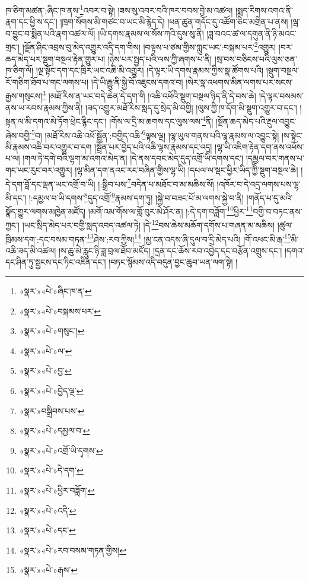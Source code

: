 ཁ་ཅིག་མཚན་:ཞིང་ཁ་ནས་\footnote{«སྣར་»«པེ་»ཞིང་ཁ་ན་}འབར་བ་སྟེ། །ཟས་སུ་འབར་བའི་ཁར་བབས་བྱེ་མ་འཚལ། །སྨད་རིགས་འགའ་ནི་རྣག་དང་ཕྱི་ས་དང་། །ཁྲག་སོགས་མི་གཙང་བ་ཡང་མི་རྙེད་དེ། །ཕན་ཚུན་གདོང་དུ་འཚོག་ཅིང་མགྲིན་པ་ནས། །ལྦ་བ་བྱུང་བ་སྨིན་པའི་རྣག་འཚལ་ལོ། །ཡི་དགས་རྣམས་ལ་སོས་ཀའི་དུས་སུ་ནི། །ཟླ་བའང་ཚ་ལ་དགུན་ནི་ཉི་མའང་གྲང་། །ལྗོན་ཤིང་འབྲས་བུ་མེད་འགྱུར་འདི་དག་གིས། །བལྟས་པ་ཙམ་གྱིས་ཀླུང་ཡང་:བསྐམ་པར་\footnote{«སྣར་»«པེ་»བསྐམས་པར་}འགྱུར། །བར་ཆད་མེད་པར་སྡུག་བསྔལ་རྟེན་གྱུར་པ། །ཉེས་པར་སྤྱད་པའི་ལས་ཀྱི་ཞགས་པ་ནི། །སྲ་བས་བཅིངས་པའི་ལུས་ཅན་ཁ་ཅིག་ལོ། །ལྔ་སྟོང་དག་དང་ཁྲིར་ཡང་འཆི་མི་འགྱུར། །དེ་ལྟར་ཡི་དགས་རྣམས་ཀྱིས་སྣ་ཚོགས་པའི། །སྡུག་བསྔལ་རོ་གཅིག་ཐོབ་པ་གང་ལགས་པ། །དེ་ཡི་རྒྱུ་ནི་སྐྱེ་བོ་འཇུངས་དགའ་བ། །སེར་སྣ་འཕགས་མིན་ལགས་པར་སངས་རྒྱས་གསུངས།\footnote{«སྣར་»«པེ་»གསུང་།} །མཐོ་རིས་ན་ཡང་བདེ་ཆེན་དེ་དག་གི །འཆི་འཕོའི་སྡུག་བསྔལ་ཉིད་ནི་དེ་བས་ཆེ། །དེ་ལྟར་བསམས་ནས་ཡ་རབས་རྣམས་ཀྱིས་ནི། །ཟད་འགྱུར་མཐོ་རིས་སླད་དུ་སྲེད་མི་བགྱི། །ལུས་ཀྱི་ཁ་དོག་མི་སྡུག་འགྱུར་བ་དང་། །སྟན་ལ་མི་དགའ་མེ་ཏོག་ཕྲེང་རྙིང་དང་། །གོས་ལ་དྲི་མ་ཆགས་དང་ལུས་ལས་\footnote{«སྣར་»«པེ་»ལ་}ནི། །སྔོན་ཆད་མེད་པའི་རྔུལ་འབྱུང་ཞེས་བགྱི་\footnote{«སྣར་»«པེ་»བྱ་}བ། །མཐོ་རིས་འཆི་འཕོ་སྦྲོན་:བགྱིད་འཆི་\footnote{«སྣར་»«པེ་»བྱེད་ལྔ་}ལྟས་ལྔ། །ལྷ་ཡུལ་གནས་པའི་ལྷ་རྣམས་ལ་འབྱུང་སྟེ། །ས་སྟེང་མི་རྣམས་འཆི་བར་འགྱུར་བ་དག །སྦྲོན་པར་བྱེད་པའི་འཆི་ལྟས་རྣམས་དང་འདྲ། །ལྷ་ཡི་འཇིག་རྟེན་དག་ནས་འཕོས་པ་ལ། །གལ་ཏེ་དགེ་བའི་ལྷག་མ་འགའ་མེད་ན། །དེ་ནས་དབང་མེད་དུད་འགྲོ་ཡི་དགས་དང་། །དམྱལ་བར་གནས་པ་གང་ཡང་རུང་བར་འགྱུར། །ལྷ་མིན་དག་ནའང་རང་བཞིན་གྱིས་ལྷ་ཡི། །དཔལ་ལ་སྡང་ཕྱིར་ཡིད་ཀྱི་སྡུག་བསྔལ་ཆེ། །དེ་དག་བློ་དང་ལྡན་ཡང་འགྲོ་བ་ཡི། །:སྒྲིབ་པས་\footnote{«སྣར་»བསྒྲིབས་པས་}བདེན་པ་མཐོང་བ་མ་མཆིས་སོ། །འཁོར་བ་དེ་འདྲ་ལགས་པས་ལྷ་མི་དང་། །:དམྱལ་བ་ཡི་དགས་\footnote{«སྣར་»«པེ་»དམྱལ་བ་}དུད་འགྲོ་\footnote{«སྣར་»«པེ་»འགྲོ་ཡི་དྭགས་}རྣམས་དག་ཏུ། །སྐྱེ་བ་བཟང་པོ་མ་ལགས་སྐྱེ་བ་ནི། །གནོད་པ་དུ་མའི་སྣོད་གྱུར་ལགས་མཁྱེན་མཛོད། །མགོ་འམ་གོས་ལ་གློ་བུར་མེ་ཤོར་ན། །:དེ་དག་བཟློག་\footnote{«སྣར་»«པེ་»དེ་དག་}ཕྱིར་\footnote{«སྣར་»«པེ་»ཕྱིར་བཟློག་}བགྱི་བ་བཏང་ནས་ཀྱང་། །ཡང་སྲིད་མེད་པར་བགྱི་སླད་འབད་འཚལ་ཏེ། །དེ་\footnote{«སྣར་»«པེ་»འདི་}བས་ཆེས་མཆོག་དགོས་པ་གཞན་མ་མཆིས། །ཚུལ་ཁྲིམས་དག་:དང་བསམ་གཏན་\footnote{«སྣར་»«པེ་»དང་}ཤེས་:རབ་ཀྱིས།\footnote{«སྣར་»«པེ་»རབ་བསམ་གཏན་གྱིས།} །མྱ་ངན་འདས་ཞི་དུལ་བ་དྲི་མེད་པའི། །གོ་འཕང་མི་རྒ་\footnote{«སྣར་»«པེ་»རྒས་}མི་འཆི་ཟད་མི་འཚལ། །ས་ཆུ་མེ་རླུང་ཉི་ཟླ་བྲལ་ཐོབ་མཛོད། །དྲན་དང་ཆོས་རབ་འབྱེད་དང་བརྩོན་འགྲུས་དང་། །དགའ་དང་ཤིན་ཏུ་སྦྱངས་དང་ཏིང་འཛིན་དང་། །བཏང་སྙོམས་འདི་བདུན་བྱང་ཆུབ་ཡན་ལག་སྟེ། །
